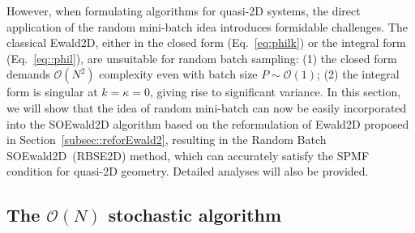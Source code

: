 However, when formulating algorithms for quasi-2D systems, the direct application of the random mini-batch idea introduces formidable challenges.
The classical Ewald2D, either in the closed form (Eq.~\eqref{eq:philk}) or the integral form (Eq.~\eqref{eq::phil}), are unsuitable for random batch sampling:
(1) the closed form demands $\mathcal{O}(N^2)$ complexity even with batch size $P\sim\mathcal O(1)$; 
(2) the integral form is singular at $k=\kappa=0$, giving rise to significant variance.
In this section, we will show that the idea of random mini-batch can now be easily incorporated into the SOEwald2D algorithm based on the reformulation of Ewald2D proposed in Section~\ref{subsec::reforEwald2}, resulting in the Random Batch SOEwald2D~(RBSE2D) method, which can accurately satisfy the SPMF condition for quasi-2D geometry.
Detailed analyses will also be provided.

\subsection{The $\mathcal{O}(N)$ stochastic algorithm} \label{subsec::rbis}


